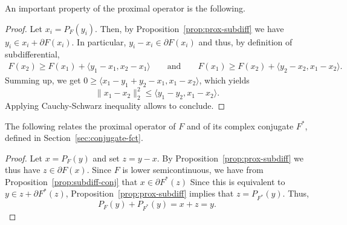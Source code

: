  An important property of the proximal operator is the following.
 
 
 \begin{proof}
     Let $x_i = P_F(y_i)$. Then, by Proposition~\ref{prop:prox-subdiff} we have $y_i \in x_i+\partial F(x_i)$. In particular, $y_i - x_i \in \partial F(x_i)$ and thus, by definition of subdifferential,
     \begin{gather}
         F(x_2) \ge F(x_1) + \langle y_1-x_1,x_2-x_1 \rangle
         \qquad\text{and}\qquad
         F(x_1) \ge F(x_2) + \langle y_2-x_2,x_1-x_2 \rangle .
     \end{gather}
     Summing up, we get $0\ge \langle x_1-y_1+y_2-x_1,x_1-x_2 \rangle$, which yields
     \begin{equation}
         \|x_1-x_2\|_2^2 \le \langle y_1-y_2,x_1-x_2\rangle.
     \end{equation}
     Applying Cauchy-Schwarz inequality allows to conclude.
 \end{proof}
 
 The following relates the proximal operator of $F$ and of its complex conjugate $F^*$, defined in Section~\ref{sec:conjugate-fct}.
 
 
 \begin{proof}
     Let $x = P_F(y)$ and set $z=y-x$. By Proposition~\ref{prop:prox-subdiff} we thus have $z\in \partial F(x)$. Since $F$ is lower semicontinuous, we have from Proposition~\ref{prop:subdiff-conj} that $x\in \partial F^*(z)$ Since this is equivalent to $y\in z + \partial F^*(z)$, Proposition~\ref{prop:prox-subdiff} implies that $z = P_{F^*}(y)$. Thus,
     \begin{equation}
         P_F(y) + P_{F^*}(y) = x + z = y.
     \end{equation}
 \end{proof}
 
